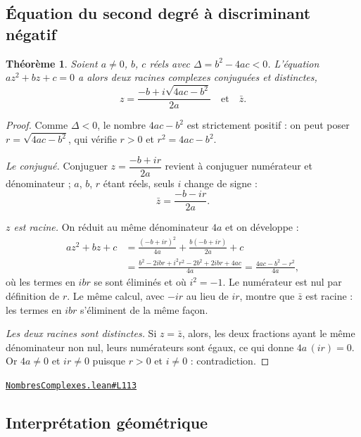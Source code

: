 \documentclass[11pt,a4paper]{article}
\theoremstyle{definition}
\theoremstyle{plain}
\newtheorem{theoreme}{Théorème}
\newcommand{\source}[2]{\par\smallskip\noindent\hfill{\footnotesize\href{#1}{\texttt{#2}}}\par\smallskip}
\begin{document}
\subsection{Équation du second degré à discriminant négatif}

\begin{theoreme}
Soient $a \ne 0$, $b$, $c$ réels avec $\Delta = b^{2} - 4ac < 0$. L'équation
$az^{2} + bz + c = 0$ a alors deux racines complexes conjuguées et distinctes,
\[ z = \frac{-b + i\sqrt{4ac - b^{2}}}{2a} \quad\text{et}\quad \bar z . \]
\end{theoreme}

\begin{proof}
Comme $\Delta < 0$, le nombre $4ac - b^{2}$ est strictement positif : on peut poser
$r = \sqrt{4ac - b^{2}}$, qui vérifie $r > 0$ et $r^{2} = 4ac - b^{2}$.

\smallskip\noindent
\emph{Le conjugué.} Conjuguer $z = \dfrac{-b + ir}{2a}$ revient à conjuguer numérateur et
dénominateur ; $a$, $b$, $r$ étant réels, seuls $i$ change de signe :
\[ \bar z = \frac{-b - ir}{2a} . \]

\smallskip\noindent
\emph{$z$ est racine.} On réduit au même dénominateur $4a$ et on développe :
\begin{align*}
a z^{2} + b z + c
  &= \frac{(-b + ir)^{2}}{4a} + \frac{b(-b + ir)}{2a} + c \\
  &= \frac{b^{2} - 2ibr + i^{2}r^{2} - 2b^{2} + 2ibr + 4ac}{4a}
   = \frac{4ac - b^{2} - r^{2}}{4a} ,
\end{align*}
où les termes en $ibr$ se sont éliminés et où $i^{2} = -1$. Le numérateur est nul par
définition de $r$. Le même calcul, avec $-ir$ au lieu de $ir$, montre que $\bar z$ est
racine : les termes en $ibr$ s'éliminent de la même façon.

\smallskip\noindent
\emph{Les deux racines sont distinctes.} Si $z = \bar z$, alors, les deux fractions ayant
le même dénominateur non nul, leurs numérateurs sont égaux, ce qui donne
$4a\,(ir) = 0$. Or $4a \ne 0$ et $ir \ne 0$ puisque $r > 0$ et $i \ne 0$ : contradiction.
\end{proof}
\source{https://github.com/Commutator-IO/learn-lean/blob/main/courses/02-lycee/07-nombres-complexes/NombresComplexes.lean\#L113}{NombresComplexes.lean\#L113}

\subsection{Interprétation géométrique}
\end{document}

